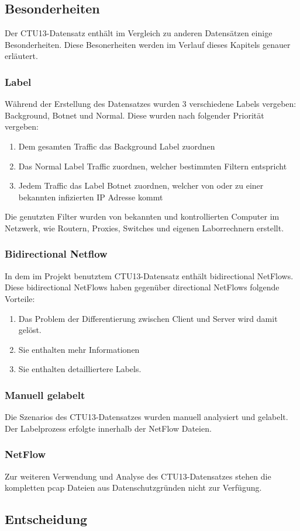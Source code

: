 \documentclass[main.tex]{subfiles}
\begin{document}
\subsection{Besonderheiten}
Der CTU13-Datensatz enthält im Vergleich zu anderen Datensätzen einige Besonderheiten. Diese Besonerheiten werden im Verlauf dieses Kapitels genauer erläutert.
\subsubsection{Label}
Während der Erstellung des Datensatzes wurden 3 verschiedene Labels vergeben: Background, Botnet und Normal. Diese wurden nach folgender Priorität vergeben: 
\begin{center}
\begin{enumerate}
\item Dem gesamten Traffic das Background Label zuordnen
\item Das Normal Label Traffic zuordnen, welcher bestimmten Filtern entspricht
\item Jedem Traffic das Label Botnet zuordnen, welcher von oder zu einer bekannten infizierten IP Adresse kommt
\end{enumerate}
\end{center}
Die genutzten Filter wurden von bekannten und kontrollierten Computer im Netzwerk, wie Routern, Proxies, Switches und eigenen Laborrechnern erstellt.
\subsubsection{Bidirectional Netflow}
In dem im Projekt benutztem CTU13-Datensatz enthält bidirectional NetFlows. Diese bidirectional NetFlows haben gegenüber directional NetFlows folgende Vorteile: 
\begin{center}
\begin{enumerate}
\item Das Problem der Differentierung zwischen Client und Server wird damit gelöst.
\item Sie enthalten mehr Informationen
\item Sie enthalten detailliertere Labels.
\end{enumerate}
\end{center}
\subsubsection{Manuell gelabelt}
Die Szenarios des CTU13-Datensatzes wurden manuell analysiert und gelabelt. Der Labelprozess erfolgte innerhalb der NetFlow Dateien.
\subsubsection{NetFlow}
Zur weiteren Verwendung und Analyse des CTU13-Datensatzes stehen die kompletten pcap Dateien aus Datenschutzgründen nicht zur Verfügung.
\subsection{Entscheidung}
\end{document}
